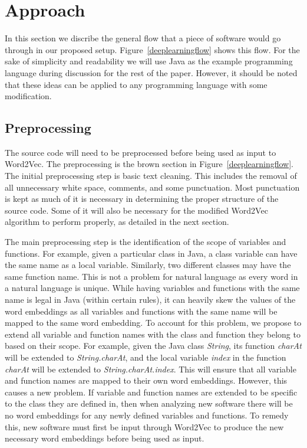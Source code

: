 \section{Approach} \label{approach}

In this section we discribe the general flow that a piece of software would go through in our proposed setup. Figure~\ref{deeplearningflow} shows this flow. For the sake of simplicity and readability we will use Java as the example programming language during discussion for the rest of the paper. However, it should be noted that these ideas can be applied to any programming language with some modification.

\subsection{Preprocessing}

The source code will need to be preprocessed before being used as input to Word2Vec. The preprocessing is the brown section in Figure~\ref{deeplearningflow}. The initial preprocessing step is basic text cleaning. This includes the removal of all unnecessary white space, comments, and some punctuation. Most punctuation is kept as much of it is necessary in determining the proper structure of the source code. Some of it will also be necessary for the modified Word2Vec algorithm to perform properly, as detailed in the next section.

The main preprocessing step is the identification of the scope of variables and functions. For example, given a particular class in Java, a class variable can have the same name as a local variable. Similarly, two different classes may have the same function name. This is not a problem for natural language as every word in a natural language is unique. While having variables and functions with the same name is legal in Java (within certain rules), it can heavily skew the values of the word embeddings as all variables and functions with the same name will be mapped to the same word embedding. To account for this problem, we propose to extend all variable and function names with the class and function they belong to based on their scope. For example, given the Java class \textit{String}, its function \textit{charAt} will be extended to \textit{String.charAt}, and the local variable \textit{index} in the function \textit{charAt} will be extended to \textit{String.charAt.index}. This will ensure that all variable and function names are mapped to their own word embeddings. However, this causes a new problem. If variable and function names are extended to be specific to the class they are defined in, then when analyzing new software there will be no word embeddings for any newly defined variables and functions. To remedy this, new software must first be input through Word2Vec to produce the new necessary word embeddings before being used as input.

